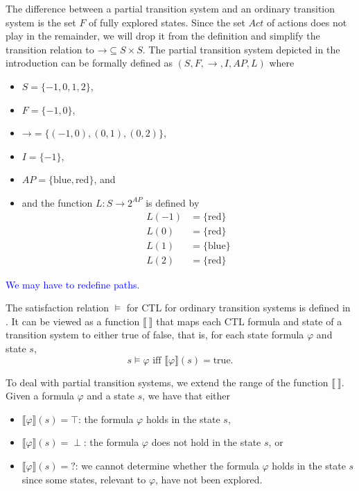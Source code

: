 \documentclass[12pt]{article}
\theoremstyle{definition}
\newcommand{\satisfaction}[1]{\llbracket #1 \rrbracket}
\begin{document}
The difference between a partial transition system and an ordinary transition system is the set $F$ of fully explored states.  Since the set $\mathit{Act}$ of actions does not play in the remainder, we will drop it from the definition and simplify the transition relation to $\mathord{\rightarrow} \subseteq S \times S$. The partial transition system depicted in the introduction can be formally defined as $(S, F, \rightarrow, I, \mathit{AP}, L)$ where
\begin{itemize}
\item 
$S = \{ -1, 0, 1, 2 \}$,
\item
$F = \{ -1, 0 \}$,
\item
$\mathord{\rightarrow} = \{ (-1, 0), (0, 1), (0, 2) \}$,
\item
$I = \{ -1 \}$,
\item
$\mathit{AP} = \{ \mbox{blue}, \mbox{red} \}$, and
\item
and the function $L : S \to 2^{\mathit{AP}}$ is defined by
\begin{align*}
L(-1) & = \{ \mbox{red} \}\\
L(0) & = \{ \mbox{red} \}\\
L(1) & = \{ \mbox{blue} \}\\
L(2) & = \{ \mbox{red} \}
\end{align*}
\end{itemize} 

\textcolor{blue}{We may have to redefine paths.}

The satisfaction relation $\models$ for CTL for ordinary transition systems is defined in \cite[Definition~6.4]{BK08}.  It can be viewed as a function $\satisfaction{\ }$ that maps each CTL formula and state of a transition system to either true of false, that is, for each state formula $\varphi$ and state $s$,
\[
s \models \varphi \mbox{ iff } \satisfaction{\varphi}(s) = \mbox{true}.
\]

To deal with partial transition systems, we extend the range of the function $\satisfaction{\ }$.  Given a formula $\varphi$ and a state $s$, we have that either
\begin{itemize}
\item 
$\satisfaction{\varphi}(s) = \top$: the formula $\varphi$ holds in the state $s$,
\item
$\satisfaction{\varphi}(s) = \perp$: the formula $\varphi$ does not hold in the state $s$, or
\item
$\satisfaction{\varphi}(s) = \mathord{?}$: we cannot determine whether the formula $\varphi$ holds in the state $s$ since some states, relevant to $\varphi$,  have not been explored.
\end{itemize}
\end{document}
